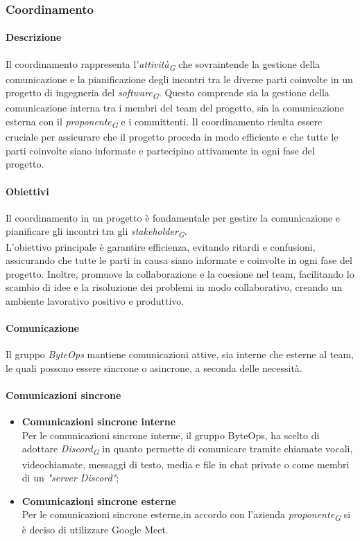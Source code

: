 \subsubsection{Coordinamento}

\paragraph{Descrizione}
Il coordinamento rappresenta l'\textit{attività}\textsubscript{\textit{G}} che sovraintende la gestione della comunicazione e la pianificazione degli incontri tra le diverse parti coinvolte in un progetto di ingegneria del \textit{software}\textsubscript{\textit{G}}. Questo comprende sia la gestione della comunicazione interna tra i membri del team del progetto, sia la comunicazione esterna con il \textit{proponente}\textsubscript{\textit{G}} e i committenti. Il coordinamento risulta essere cruciale per assicurare che il progetto proceda in modo efficiente e che tutte le parti coinvolte siano informate e partecipino attivamente in ogni fase del progetto.

\paragraph{Obiettivi}
Il coordinamento in un progetto è fondamentale per gestire la comunicazione e pianificare gli incontri tra gli \textit{stakeholder}\textsubscript{\textit{G}}. \\
L'obiettivo principale è garantire efficienza, evitando ritardi e confusioni, assicurando che tutte le parti in causa siano informate e coinvolte in ogni fase del progetto. Inoltre, promuove la collaborazione e la coesione nel team, facilitando lo scambio di idee e la risoluzione dei problemi in modo collaborativo, creando un ambiente lavorativo positivo e produttivo.

\paragraph*{Comunicazione}
Il gruppo \textit{ByteOps} mantiene comunicazioni attive, sia interne che esterne al team, le quali possono essere sincrone o asincrone, a seconda delle necessità.

\paragraph{Comunicazioni sincrone}
\begin{itemize}
  \item \textbf{Comunicazioni sincrone interne} \\
  Per le comunicazioni sincrone interne, il gruppo ByteOps, ha scelto di adottare \textit{Discord}\textsubscript{\textit{G}} in quanto permette di comunicare tramite chiamate vocali, videochiamate, messaggi di testo, media e file in chat private o come membri di un \textit{"server Discord"};

  \item \textbf{Comunicazioni sincrone esterne} \\
  Per le comunicazioni sincrone esterne,in accordo con l'azienda \textit{proponente}\textsubscript{\textit{G}} si è deciso di utilizzare Google Meet.
\end{itemize}

